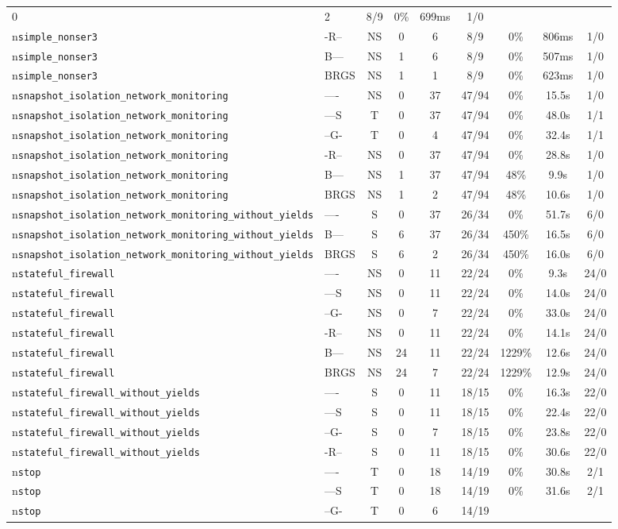 \begin{tabular}{llccccccc}
0 & 2 & 8/9 & 0\% & 699ms & 1/0 \\n\texttt{simple\_nonser3} & -R-- & NS & 0 & 6 & 8/9 & 0\% & 806ms & 1/0 \\n\texttt{simple\_nonser3} & B--- & NS & 1 & 6 & 8/9 & 0\% & 507ms & 1/0 \\n\texttt{simple\_nonser3} & BRGS & NS & 1 & 1 & 8/9 & 0\% & 623ms & 1/0 \\n\texttt{snapshot\_isolation\_network\_monitoring} & ---- & NS & 0 & 37 & 47/94 & 0\% & 15.5s & 1/0 \\n\texttt{snapshot\_isolation\_network\_monitoring} & ---S & T & 0 & 37 & 47/94 & 0\% & 48.0s & 1/1 \\n\texttt{snapshot\_isolation\_network\_monitoring} & --G- & T & 0 & 4 & 47/94 & 0\% & 32.4s & 1/1 \\n\texttt{snapshot\_isolation\_network\_monitoring} & -R-- & NS & 0 & 37 & 47/94 & 0\% & 28.8s & 1/0 \\n\texttt{snapshot\_isolation\_network\_monitoring} & B--- & NS & 1 & 37 & 47/94 & 48\% & 9.9s & 1/0 \\n\texttt{snapshot\_isolation\_network\_monitoring} & BRGS & NS & 1 & 2 & 47/94 & 48\% & 10.6s & 1/0 \\n\texttt{snapshot\_isolation\_network\_monitoring\_without\_yields} & ---- & S & 0 & 37 & 26/34 & 0\% & 51.7s & 6/0 \\n\texttt{snapshot\_isolation\_network\_monitoring\_without\_yields} & B--- & S & 6 & 37 & 26/34 & 450\% & 16.5s & 6/0 \\n\texttt{snapshot\_isolation\_network\_monitoring\_without\_yields} & BRGS & S & 6 & 2 & 26/34 & 450\% & 16.0s & 6/0 \\n\texttt{stateful\_firewall} & ---- & NS & 0 & 11 & 22/24 & 0\% & 9.3s & 24/0 \\n\texttt{stateful\_firewall} & ---S & NS & 0 & 11 & 22/24 & 0\% & 14.0s & 24/0 \\n\texttt{stateful\_firewall} & --G- & NS & 0 & 7 & 22/24 & 0\% & 33.0s & 24/0 \\n\texttt{stateful\_firewall} & -R-- & NS & 0 & 11 & 22/24 & 0\% & 14.1s & 24/0 \\n\texttt{stateful\_firewall} & B--- & NS & 24 & 11 & 22/24 & 1229\% & 12.6s & 24/0 \\n\texttt{stateful\_firewall} & BRGS & NS & 24 & 7 & 22/24 & 1229\% & 12.9s & 24/0 \\n\texttt{stateful\_firewall\_without\_yields} & ---- & S & 0 & 11 & 18/15 & 0\% & 16.3s & 22/0 \\n\texttt{stateful\_firewall\_without\_yields} & ---S & S & 0 & 11 & 18/15 & 0\% & 22.4s & 22/0 \\n\texttt{stateful\_firewall\_without\_yields} & --G- & S & 0 & 7 & 18/15 & 0\% & 23.8s & 22/0 \\n\texttt{stateful\_firewall\_without\_yields} & -R-- & S & 0 & 11 & 18/15 & 0\% & 30.6s & 22/0 \\n\texttt{stop} & ---- & T & 0 & 18 & 14/19 & 0\% & 30.8s & 2/1 \\n\texttt{stop} & ---S & T & 0 & 18 & 14/19 & 0\% & 31.6s & 2/1 \\n\texttt{stop} & --G- & T & 0 & 6 & 14/19 & 
\end{tabular}
